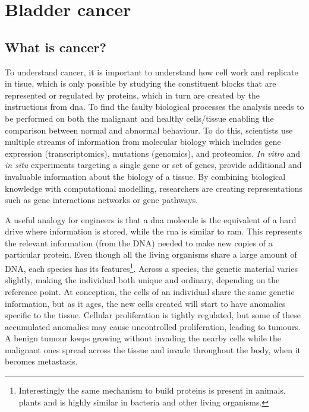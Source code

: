 
\section{Bladder cancer} \label{s:lit:biology}

\vspace{3mm}
\vspace{3mm}

\subsection{What is cancer?}

To understand cancer, it is important to understand how cell work and replicate in tisue, which is only possible by studying the constituent blocks that are represented or regulated by proteins, which in turn are created by the instructions from \acrfull{dna}. To find the faulty biological processes the analysis needs to be performed on both the malignant and healthy cells/tissue enabling the comparison between normal and abnormal behaviour. To do this, scientists use multiple streams of information from molecular biology which includes gene expression (transcriptomics), mutations (genomics), and proteomics. \textit{In vitro} and \textit{in situ} experiments targeting a single gene or set of genes, provide additional and invaluable information about the biology of a tissue. By combining biological knowledge with computational modelling, researchers are creating representations such as gene interactions networks or gene pathways. 

A useful analogy for engineers is that a \acrshort{dna} molecule is the equivalent of a hard drive where information is stored, while the \acrfull{rna} is similar to \acrfull{ram}. This represents the relevant information (from the DNA) needed to make new copies of a particular protein. Even though all the living organisms share a large amount of DNA, each species has its features\footnote{Interestingly the same mechanism to build proteins is present in animals, plants and is highly similar in bacteria and other living organisms.}. Across a species, the genetic material varies slightly, making the individual both unique and ordinary, depending on the reference point. At conception, the cells of an individual share the same genetic information, but as it ages, the new cells created will start to have anomalies specific to the tissue. Cellular proliferation is tightly regulated, but some of these accumulated anomalies may cause uncontrolled proliferation, leading to tumours. A benign tumour keeps growing without invading the nearby cells while the malignant ones spread across the tissue and invade throughout the body, when it becomes metastasis. 

